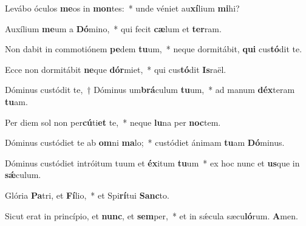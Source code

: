 \item Levábo óculos \textbf{me}os in \textbf{mon}tes:~* unde véniet au\textbf{xí}lium \textbf{mi}hi?

\item Auxílium \textbf{me}um a \textbf{Dó}mino,~* qui fecit \textbf{cæ}lum et \textbf{ter}ram.

\item Non dabit in commotiónem \textbf{pe}dem \textbf{tu}um,~* neque dormitábit, \textbf{qui} cus\textbf{tó}dit te.

\item Ecce non dormitábit \textbf{ne}que \textbf{dór}miet,~* qui cus\textbf{tó}dit \textbf{Is}raël.

\item Dóminus custódit te,~† Dóminus um\textbf{brá}culum \textbf{tu}um,~* ad manum \textbf{déx}teram \textbf{tu}am.

\item Per diem sol non per\textbf{cú}ti\textbf{et} te,~* neque \textbf{lu}na per \textbf{noc}tem.

\item Dóminus custódiet te ab \textbf{om}ni \textbf{ma}lo;~* custódiet ánimam \textbf{tu}am \textbf{Dó}minus.

\item Dóminus custódiet intróitum tuum et \textbf{éx}itum \textbf{tu}um~* ex hoc nunc et \textbf{us}que in \textbf{sǽ}culum.

\item Glória \textbf{Pa}tri, et \textbf{Fí}lio,~* et Spi\textbf{rí}tui \textbf{Sanc}to.

\item Sicut erat in princípio, et \textbf{nunc}, et \textbf{sem}per,~* et in sǽcula sæcu\textbf{ló}rum. \textbf{A}men.